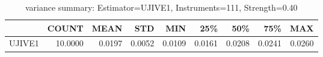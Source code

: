 \begin{table}[ht]
\centering
\caption{variance summary: Estimator=UJIVE1, Instruments=111, Strength=0.40}
\begin{tabular}{lrrrrrrrr}
\toprule
 & COUNT & MEAN & STD & MIN & 25\% & 50\% & 75\% & MAX \\
\midrule
UJIVE1 & 10.0000 & 0.0197 & 0.0052 & 0.0109 & 0.0161 & 0.0208 & 0.0241 & 0.0260 \\
\bottomrule
\end{tabular}
\end{table}
